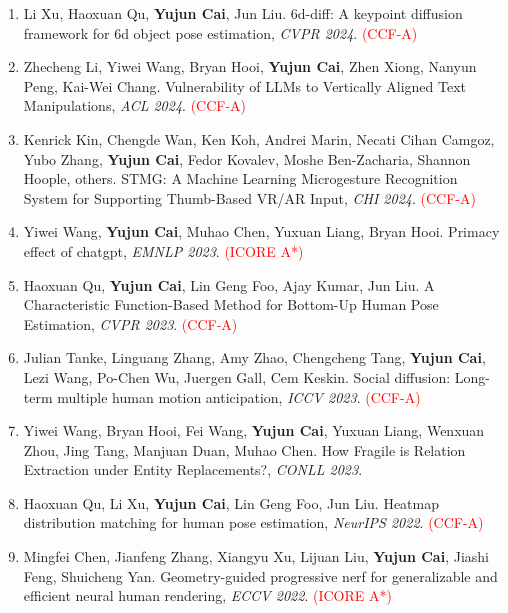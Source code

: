 \documentclass[UTF8,a4paper,11pt,fontset=fandol]{ctexart}
\begin{document}
\begin{enumerate}
\item Li Xu, Haoxuan Qu, \textbf{Yujun Cai}, Jun Liu. 6d-diff: A keypoint diffusion framework for 6d object pose estimation, \textit{CVPR 2024}. \textcolor{red}{(CCF-A)}

\item Zhecheng Li, Yiwei Wang, Bryan Hooi, \textbf{Yujun Cai}, Zhen Xiong, Nanyun Peng, Kai-Wei Chang. Vulnerability of LLMs to Vertically Aligned Text Manipulations, \textit{ACL 2024}. \textcolor{red}{(CCF-A)}

\item Kenrick Kin, Chengde Wan, Ken Koh, Andrei Marin, Necati Cihan Camgoz, Yubo Zhang, \textbf{Yujun Cai}, Fedor Kovalev, Moshe Ben-Zacharia, Shannon Hoople, others. STMG: A Machine Learning Microgesture Recognition System for Supporting Thumb-Based VR/AR Input, \textit{CHI 2024}. \textcolor{red}{(CCF-A)}

\item Yiwei Wang, \textbf{Yujun Cai}, Muhao Chen, Yuxuan Liang, Bryan Hooi. Primacy effect of chatgpt, \textit{EMNLP 2023}. \textcolor{red}{(ICORE A*)}

\item Haoxuan Qu, \textbf{Yujun Cai}, Lin Geng Foo, Ajay Kumar, Jun Liu. A Characteristic Function-Based Method for Bottom-Up Human Pose Estimation, \textit{CVPR 2023}. \textcolor{red}{(CCF-A)}

\item Julian Tanke, Linguang Zhang, Amy Zhao, Chengcheng Tang, \textbf{Yujun Cai}, Lezi Wang, Po-Chen Wu, Juergen Gall, Cem Keskin. Social diffusion: Long-term multiple human motion anticipation, \textit{ICCV 2023}. \textcolor{red}{(CCF-A)}

\item Yiwei Wang, Bryan Hooi, Fei Wang, \textbf{Yujun Cai}, Yuxuan Liang, Wenxuan Zhou, Jing Tang, Manjuan Duan, Muhao Chen. How Fragile is Relation Extraction under Entity Replacements?, \textit{CONLL 2023}.

\item Haoxuan Qu, Li Xu, \textbf{Yujun Cai}, Lin Geng Foo, Jun Liu. Heatmap distribution matching for human pose estimation, \textit{NeurIPS 2022}. \textcolor{red}{(CCF-A)}

\item Mingfei Chen, Jianfeng Zhang, Xiangyu Xu, Lijuan Liu, \textbf{Yujun Cai}, Jiashi Feng, Shuicheng Yan. Geometry-guided progressive nerf for generalizable and efficient neural human rendering, \textit{ECCV 2022}. \textcolor{red}{(ICORE A*)}


\end{enumerate}
\end{document}
